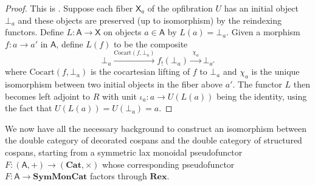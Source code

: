 \documentclass[reqno]{amsart}
\let\maps\colon
\theoremstyle{definition}
\theoremstyle{remark}
\newcommand{\A}{\mathsf{A}}
\newcommand{\X}{\mathsf{X}}
\newcommand{\bicat}{\mathbf}
\newcommand{\Cat}{\bicat{Cat}}
\newcommand{\Rex}{\bicat{Rex}}
\newcommand{\SMC}{\bicat{SymMonCat}}
\begin{document}
\begin{proof}
 This is \cite[Proposition~4.4]{Gray}.    Suppose each fiber $\X_a$ of the opfibration $U$ has an initial object $\bot_a$ and these objects are preserved (up to isomorphism) by the reindexing functors.   Define $L \maps \A \to \X$ on objects $a \in \A$ by $L(a) = \bot_a$.   Given a morphism $f\maps a\to a'$ in $\A$, define $L(f)$ to be the composite
 \begin{equation}\label{eq:Lonarrows}
  \bot_a\xrightarrow{\mathrm{Cocart}(f,\bot_a)}f_!(\bot_a)\xrightarrow{\;\chi_a\;}\bot_{a'}
 \end{equation}
where $\mathrm{Cocart}(f,\bot_a)$ is the cocartesian lifting of $f$ to $\bot_a$ and $\chi_a$ is the unique isomorphism between two initial objects in the fiber above $a'$.    The functor $L$ then becomes left adjoint to $R$ with unit $\iota_a \maps a \to U(L(a))$ being the identity, using the fact that $U(L(a)) = U(\bot_a) = a$.
\end{proof}

We now have all the necessary background to construct an isomorphism between the double category of decorated cospans and the double category of structured cospans, starting from a symmetric lax monoidal pseudofunctor $F \maps (\A, +) \to (\Cat, \times)$ whose corresponding pseudofunctor $ F\maps \A \to \SMC$ factors through $\Rex$.
\end{document}
